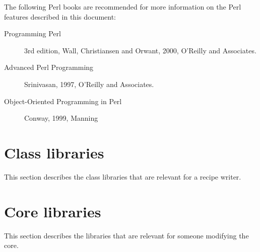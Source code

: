 \documentclass[twoside,11pt]{article}
\renewcommand{\_}{\texttt{\symbol{95}}}
\begin{document}
The following Perl books are recommended for more information on the
Perl features described in this document:

\begin{description}

\item[Programming Perl] 3rd edition, Wall, Christiansen and Orwant,
  2000, O'Reilly and Associates.

\item[Advanced Perl Programming] Srinivasan, 1997, O'Reilly and Associates.

\item[Object-Oriented Programming in Perl] Conway, 1999, Manning

\end{description}






\section{Class libraries}

This section describes the class libraries that are relevant for
a recipe writer.



\section{Core libraries}

This section describes the libraries that are  relevant for someone
modifying the core.




\end{document}
